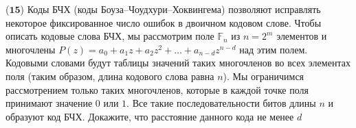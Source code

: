 ($\mathbf{15}$)
Коды БЧХ (коды Боуза–Чоудхури–Хоквингема) позволяют исправлять некоторое фиксированное число ошибок в двоичном кодовом
слове. Чтобы описать кодовые слова БЧХ, мы рассмотрим поле $\mathbb{F}_n$ из $n = 2^m$ элементов и многочлены $P(z) = a_0 +
a_1 z + a_2 z^2 + \dots + a_{n - d} z^{n - d}$ над этим полем. Кодовыми словами будут таблицы значений таких многочленов во
всех элементах поля (таким образом, длина кодового слова равна $n$). Мы ограничимся рассмотрением только таких многочленов,
которые в каждой точке поля принимают значение $0$ или $1$. Все такие последовательности битов длины $n$ и образуют код
БЧХ. Докажите, что расстояние данного кода не менее $d$